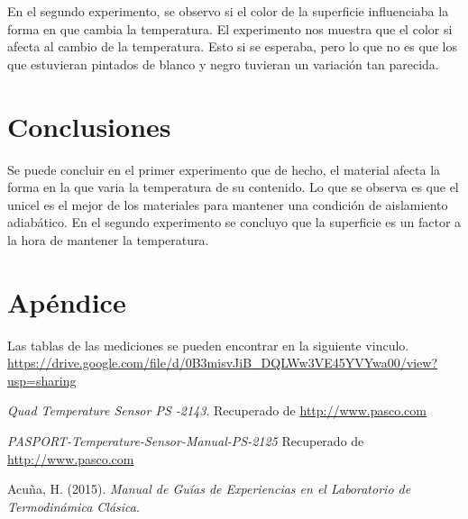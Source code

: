 \documentclass[12pt]{article}
\begin{document}
En el segundo experimento, se observo si el color de la superficie influenciaba la forma en que cambia la temperatura. El experimento nos muestra que el color si afecta al cambio de la temperatura. Esto si se esperaba, pero lo que no es que los que estuvieran pintados de blanco y negro tuvieran un variación tan parecida.
\vspace{-.5cm}
\section{Conclusiones}
Se puede concluir en el primer experimento que de hecho, el material afecta la forma en la que varia la temperatura de su contenido. Lo que se observa es que el unicel es el mejor de los materiales para mantener una condición de aislamiento adiabático. En el segundo experimento se concluyo que la superficie es un factor a la hora de mantener la temperatura.

\pagebreak
\section{Apéndice}
Las tablas de las mediciones se pueden encontrar en la siguiente vinculo.
\url{https://drive.google.com/file/d/0B3misvJiB_DQLWw3VE45YVYwa00/view?usp=sharing}

\begin{thebibliography}{6}

	
	\textit{Quad Temperature Sensor PS -2143}. Recuperado de   \url{http://www.pasco.com}

\textit{PASPORT-Temperature-Sensor-Manual-PS-2125} Recuperado de  \url{http://www.pasco.com}

Acu\~na, H. (2015). \textit{Manual de Guías de Experiencias en el Laboratorio de Termodinámica Clásica}.

\end{thebibliography}
\end{document}
